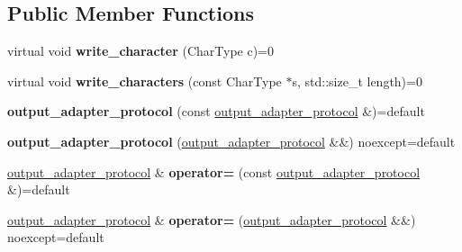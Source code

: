 \subsection*{Public Member Functions}
\begin{DoxyCompactItemize}
\item 
\mbox{\label{structnlohmann_1_1detail_1_1output__adapter__protocol_a3381896fe1be557f591de2e917cdc7d5}} 
virtual void {\bfseries write\+\_\+character} (Char\+Type c)=0
\item 
\mbox{\label{structnlohmann_1_1detail_1_1output__adapter__protocol_a2f410a164e0eda17cf6561114b0eee4a}} 
virtual void {\bfseries write\+\_\+characters} (const Char\+Type $\ast$s, std\+::size\+\_\+t length)=0
\item 
\mbox{\label{structnlohmann_1_1detail_1_1output__adapter__protocol_adf6ef7a244c32162fe98d9773f31fa8a}} 
{\bfseries output\+\_\+adapter\+\_\+protocol} (const \hyperlink{structnlohmann_1_1detail_1_1output__adapter__protocol}{output\+\_\+adapter\+\_\+protocol} \&)=default
\item 
\mbox{\label{structnlohmann_1_1detail_1_1output__adapter__protocol_a9527a27ddd468e4360a3530cbd9c35a6}} 
{\bfseries output\+\_\+adapter\+\_\+protocol} (\hyperlink{structnlohmann_1_1detail_1_1output__adapter__protocol}{output\+\_\+adapter\+\_\+protocol} \&\&) noexcept=default
\item 
\mbox{\label{structnlohmann_1_1detail_1_1output__adapter__protocol_ab2a6b7a5b86c612df2d99d2970380456}} 
\hyperlink{structnlohmann_1_1detail_1_1output__adapter__protocol}{output\+\_\+adapter\+\_\+protocol} \& {\bfseries operator=} (const \hyperlink{structnlohmann_1_1detail_1_1output__adapter__protocol}{output\+\_\+adapter\+\_\+protocol} \&)=default
\item 
\mbox{\label{structnlohmann_1_1detail_1_1output__adapter__protocol_a2235c8f3da8dfe5b26cb030f6886811a}} 
\hyperlink{structnlohmann_1_1detail_1_1output__adapter__protocol}{output\+\_\+adapter\+\_\+protocol} \& {\bfseries operator=} (\hyperlink{structnlohmann_1_1detail_1_1output__adapter__protocol}{output\+\_\+adapter\+\_\+protocol} \&\&) noexcept=default
\end{DoxyCompactItemize}


